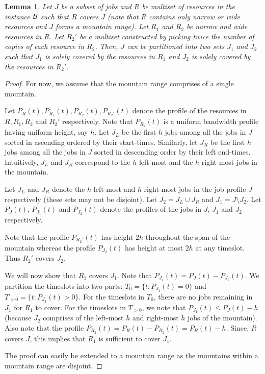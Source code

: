 \documentclass[11pt]{article}
\newtheorem{lemma}[theorem]{Lemma}
\newtheorem{proof}[theorem]{Proof}
\newcommand{\cB} {{\cal B}}
\begin{document}
\begin{lemma}
\label{lem:LLL}
Let $J$ be a subset of jobs and $R$ be multiset of resources in the instance $\cB$
such that $R$ covers $J$ (note that $R$ contains only narrow or wide resources and $J$ forms a mountain range).
Let $R_1$ and $R_2$ be narrow and wide resources in $R$. Let $R_2'$ be a multiset 
constructed by picking twice the number of copies of each resource in $R_2$.
Then, $J$ can be partitioned into two sets $J_1$ and $J_2$ such that $J_1$ is solely covered by the resources in $R_1$
and $J_2$ is solely covered by the resources in $R_2'$.
\end{lemma}
\begin{proof}
For now, we assume that the mountain range comprises of a single mountain.

Let $P_R(t), P_{R_1}(t), P_{R_2}(t), P_{R_2'}(t)$ denote the profile of the resources in $R, R_1, R_2$ and $R_2'$ respectively.
Note that $P_{R_2}(t)$ is a uniform bandwidth profile having uniform height, say $h$.
Let $J_L$ be the first $h$ jobs among all the jobs in $J$ sorted in ascending ordered by their start-times. 
Similarly, 
let $J_R$ be the first $h$ jobs among all the jobs in $J$ sorted in descending order by their left end-times.
Intuitively, $J_L$ and $J_R$ correspond to the $h$ left-most and the $h$ right-most jobs in the mountain. 


Let $J_L$ and $J_R$ denote the $h$ left-most and $h$ right-most jobs in the job profile $J$ respectively
(these sets may not be disjoint). Let $J_2 = J_L \cup J_R$ and $J_1 = J \setminus J_2$.
Let $P_J(t)$, $P_{J_1}(t)$ and $P_{J_2}(t)$ denote the profiles of the jobs in $J$, $J_1$ and $J_2$ respectively.

Note that the profile $P_{R_2'}(t)$ has height $2h$ throughout the span of the mountain whereas the profile 
$P_{J_2}(t)$ has height at most $2h$ at any timeslot. Thus $R_2'$ covers $J_2$.

We will now show that $R_1$ covers $J_1$.
Note that $P_{J_1}(t)=P_J(t)-P_{J_2}(t)$.
We partition the timeslots into two parts: $T_0=\{t:P_{J_1}(t)=0 \}$ and $T_{>0}=\{t:P_{J_1}(t)>0 \}$.
For the timeslots in $T_0$, there are no jobs remaining in $J_1$ for $R_1$ to cover. 
For the timeslots in $T_{>0}$, we note that $P_{J_1}(t) \le P_J(t)-h$
(because $J_2$ comprises of the left-most $h$ and right-most $h$ jobs of the mountain).
Also note that the profile $P_{R_1}(t) = P_R(t)-P_{R_2}(t) = P_R(t)-h$.
Since, $R$ covers $J$, this implies that $R_1$ is sufficient to cover $J_1$.

The proof can easily be extended to a mountain range as the mountains within a mountain range are disjoint.
\end{proof}
\end{document}
